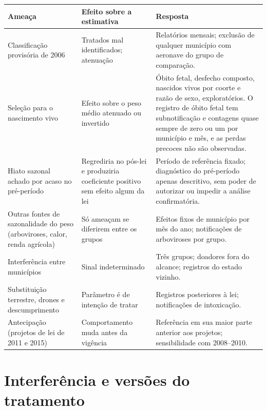 \begin{apendicesenv}
\begin{quadro}[htb]
\caption{\label{qua:ameacas2}Ameaças à identificação e respostas do desenho (continuação)}
\centering
\footnotesize
\begin{tabular}{@{}p{3.6cm}p{4.7cm}p{6.2cm}@{}}
\toprule
Ameaça & Efeito sobre a estimativa & Resposta \\
\midrule
Classificação provisória de 2006 &
Tratados mal identificados; atenuação &
Relatórios mensais; exclusão de qualquer município com aeronave do grupo de comparação. \\
Seleção para o nascimento vivo &
Efeito sobre o peso médio atenuado ou invertido &
Óbito fetal, desfecho composto, nascidos vivos por coorte e razão de sexo, exploratórios. O registro de óbito fetal tem subnotificação e contagens quase sempre de zero ou um por município e mês, e as perdas precoces não são observadas. \\
Hiato sazonal achado por acaso no pré-período &
Regrediria no pós-lei e produziria coeficiente positivo sem efeito algum da lei &
Período de referência fixado; diagnóstico do pré-período apenas descritivo, sem poder de autorizar ou impedir a análise confirmatória. \\
Outras fontes de sazonalidade do peso (arboviroses, calor, renda agrícola) &
Só ameaçam se diferirem entre os grupos &
Efeitos fixos de município por mês do ano; notificações de arboviroses por grupo. \\
Interferência entre municípios &
Sinal indeterminado &
Três grupos; doadores fora do alcance; registros do estado vizinho. \\
Substituição terrestre, drones e descumprimento &
Parâmetro é de intenção de tratar &
Registros posteriores à lei; notificações de intoxicação. \\
Antecipação (projetos de lei de 2011 e 2015) &
Comportamento muda antes da vigência &
Referência em sua maior parte anterior aos projetos; sensibilidade com 2008--2010. \\
\bottomrule
\end{tabular}
\end{quadro}

\section{Interferência e versões do tratamento}
\label{ap:interferencia}


\end{apendicesenv}

